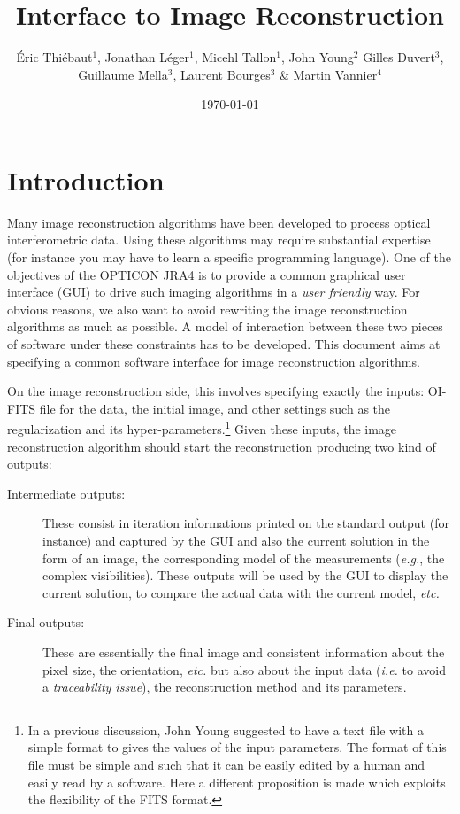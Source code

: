 \documentclass{article}
\begin{document}
\title{Interface to Image Reconstruction}

\author{Éric Thiébaut$^1$, Jonathan Léger$^1$, Micehl Tallon$^1$, John
  Young$^2$ Gilles Duvert$^3$, Guillaume Mella$^3$, Laurent Bourges$^3$ \&
  Martin Vannier$^4$}



\date{\today}

\maketitle

\section{Introduction}

Many image reconstruction algorithms have been developed to process optical
interferometric data.  Using these algorithms may require substantial
expertise (for instance you may have to learn a specific programming
language). One of the objectives of the OPTICON JRA4 is to provide a common
graphical user interface (GUI) to drive such imaging algorithms in a
\emph{user friendly} way. For obvious reasons, we also want to avoid rewriting
the image reconstruction algorithms as much as possible.  A model of
interaction between these two pieces of software under these constraints has
to be developed. This document aims at specifying a common software interface
for image reconstruction algorithms.

On the image reconstruction side, this involves specifying exactly the inputs:
OI-FITS file for the data, the initial image, and other settings such as the
regularization and its hyper-parameters.\footnote{In a previous discussion,
John Young suggested to have a text file with a simple format to gives the
values of the input parameters. The format of this file must be simple and
such that it can be easily edited by a human and easily read by a software.
Here a different proposition is made which exploits the flexibility of the
FITS format.} Given these inputs, the image reconstruction algorithm should
start the reconstruction producing two kind of outputs:
\begin{description}
  \item[Intermediate outputs:]  These consist in iteration informations
  printed on the standard output (for instance)  and captured by the GUI and
  also the current solution in the form of an image, the corresponding model
  of the measurements (\emph{e.g.}, the complex visibilities).  These outputs
  will be used by the GUI to display the current solution, to compare the
  actual data with the current model, \emph{etc.}

  \item[Final outputs:]  These are essentially the final image and consistent
  information about the pixel size, the orientation, \emph{etc.} but also
  about the input data (\emph{i.e.} to avoid a \emph{traceability issue}), the
  reconstruction method and its parameters.
\end{description}
\end{document}
